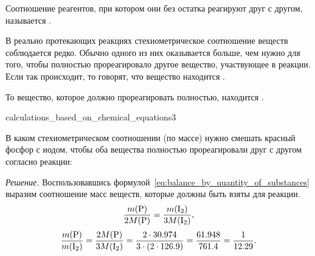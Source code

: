 Соотношение реагентов, при котором они без остатка реагируют друг с другом, называется .

В реально протекающих реакциях стехиометрическое соотношение веществ соблюдается редко. Обычно одного из них оказывается больше, чем нужно для того, чтобы полностью прореагировало другое вещество, участвующее в реакции. Если так происходит, то говорят, что вещество находится .

То вещество, которое должно прореагировать полностью, находится .

\begin{example}{}{calculations_based_on_chemical_equations3}
    \begin{condition}
        В каком стехиометрическом соотношении (по массе) нужно смешать красный фосфор с иодом, чтобы оба вещества полностью прореагировали друг с другом согласно реакции:
    \end{condition}

    \medskip

    \textit{Решение.} Воспользовавшись формулой~\eqref{eq:balance_by_quantity_of_substances} выразим соотношение масс веществ, которые должны быть взяты для реакции.
    \begin{equation*}
        \frac{m(\ce{P})}{2M(\ce{P})} = \frac{m(\ce{I2})}{3M(\ce{I2})},
    \end{equation*}
    \begin{equation*}
        \frac{m(\ce{P})}{m(\ce{I2})} = \frac{2M(\ce{P})}{3M(\ce{I2})} = \frac{2 \cdot \num{30,974}}{3 \cdot (2 \cdot \num{126,9})} = \frac{\num{61,948}}{\num{761,4}} = \frac{1}{\num{12,29}}.
    \end{equation*}
\end{example}


